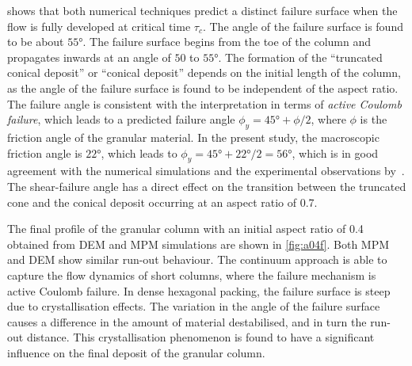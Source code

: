  shows that both 
numerical techniques predict a distinct failure surface when the flow is fully 
developed at critical time $\tau_{{c}}$. The angle of the failure 
surface is found to be about $55\si{\degree}$. The failure surface begins from 
the toe of the column and propagates inwards at an angle of $50$ to 
$55\si{\degree}$. The formation of the ``truncated conical deposit'' or 
``conical deposit'' depends on the initial length of the column, as the 
angle of the failure surface is found to be independent of the aspect ratio. 
The failure angle is consistent with the interpretation in terms of 
\textit{active Coulomb failure}, which leads to a 
predicted failure angle $\phi_{{y}}=45\si{\degree}+\phi / 2$, where 
$\phi$ is the friction angle of the granular material. In the 
present study, the macroscopic friction angle is $22\si{\degree}$, which 
leads to $\phi_{{y}}=45\si{\degree}+22\si{\degree}/ 2=56\si{\degree}$, 
which is in good agreement with the numerical simulations and the experimental 
observations by~\citet{Lajeunesse2004}. The shear-failure angle has a 
direct effect on the transition between the truncated cone and the conical 
deposit occurring at an aspect ratio of 0.7.

The final profile of the granular column with an initial aspect ratio 
of 0.4 obtained from DEM and MPM simulations are shown in \cref{fig:a04f}. Both 
MPM and DEM show similar run-out 
behaviour. The continuum approach is able to capture the flow dynamics of short 
columns, where the failure mechanism is active Coulomb failure. In dense 
hexagonal packing, the failure surface is steep due to crystallisation effects. 
The variation in the angle of the failure surface causes a difference in the 
amount of material destabilised, and in turn the run-out distance. 
This crystallisation phenomenon is found to have a significant influence on the 
final deposit of the granular column.

